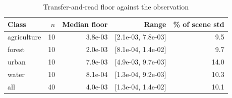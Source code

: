 \begin{table}[t]
\centering
\caption{Transfer-and-read floor against the observation}
\label{tab:representation_floor}
\footnotesize
\setlength{\tabcolsep}{3pt}
\begin{tabular}{lrrrr}
\toprule
Class & $n$ & Median floor & Range & \% of scene std \\
\midrule
agriculture & 10 & 3.8e-03 & [2.1e-03, 7.8e-03] & 9.5 \\
forest & 10 & 2.0e-03 & [8.1e-04, 1.4e-02] & 9.7 \\
urban & 10 & 7.9e-03 & [4.9e-03, 9.7e-03] & 14.0 \\
water & 10 & 8.1e-04 & [1.3e-04, 9.2e-03] & 10.3 \\
\midrule
all & 40 & 4.0e-03 & [1.3e-04, 1.4e-02] & 10.1 \\
\bottomrule
\end{tabular}
\end{table}
